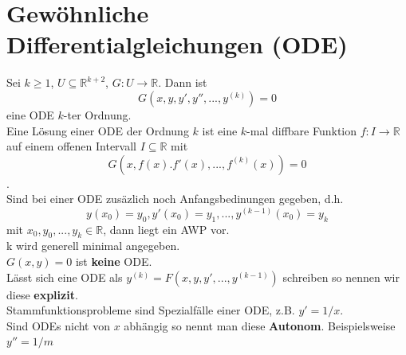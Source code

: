 \section{Gewöhnliche Differentialgleichungen (ODE)}
  Sei $k\geq1$, $U\subseteq\mathbb R^{k+2}$, $G:U\rightarrow\mathbb R$. Dann ist 
  $$G(x,y,y',y'',...,y^{(k)})=0$$ eine ODE $k$-ter Ordnung.\\
  Eine Lösung einer ODE der Ordnung $k$ ist eine $k$-mal diffbare Funktion $f:I\rightarrow\mathbb R$
  auf einem offenen Intervall $I\subseteq\mathbb R$ mit $$G(x, f(x). f'(x),...,
  f^{(k)}(x))=0$$.\\
  Sind bei einer ODE zusäzlich noch Anfangsbedinungen gegeben, d.h.
  $$y(x_0)=y_0,y'(x_0)=y_1,...,y^{(k-1)}(x_0)=y_k$$ mit $x_0,
  y_0,...,y_k\in\mathbb R$, dann liegt ein AWP vor.\\
   k wird generell minimal angegeben. \\
  $G(x, y)=0$ ist \textbf{keine} ODE.\\
  Lässt sich eine ODE als $y^{(k)}=F(x,y,y',...,y^{(k-1)})$ schreiben so nennen
  wir diese \textbf{explizit}.\\
  Stammfunktionsprobleme sind Spezialfälle einer ODE, z.B. $y'=1/x$.\\
  Sind ODEs nicht von $x$ abhängig so nennt man diese \textbf{Autonom}. Beispielsweise
  $y''=1/m$\\
